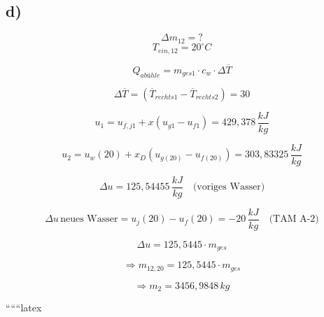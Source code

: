 

\subsection*{d)}
\[
\Delta m_{12} = ?
\]
\[
T_{ein,12} = 20^\circ C
\]

\[
Q_{abühle} = m_{ges1} \cdot c_w \cdot \Delta \overline{T}
\]

\[
\Delta \overline{T} = (\overline{T}_{rechts1} - \overline{T}_{rechts2}) = 30
\]

\[
u_1 = u_{f,j1} + x \left( u_{g1} - u_{f1} \right) = 429,378 \, \frac{kJ}{kg}
\]

\[
u_2 = u_w(20) + x_D \left( u_{g(20)} - u_{f(20)} \right) = 303,83325 \, \frac{kJ}{kg}
\]

\[
\Delta u = 125,54455 \, \frac{kJ}{kg} \quad \text{(voriges Wasser)}
\]

\[
\Delta u \, \text{neues Wasser} = u_j(20) - u_f(20) = -20 \, \frac{kJ}{kg} \quad \text{(TAM A-2)}
\]

\[
\Delta u = 125,5445 \cdot m_{ges}
\]

\[
\Rightarrow m_{12,20} = 125,5445 \cdot m_{ges}
\]

\[
\Rightarrow m_2 = 3456,9848 \, kg
\]

``````latex